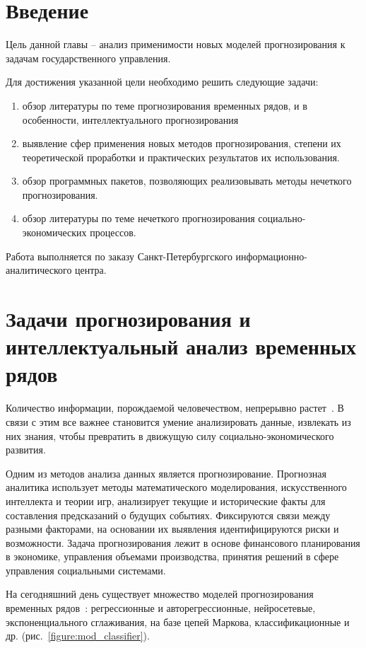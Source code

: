 \section*{Введение}

Цель данной главы – анализ применимости новых моделей прогнозирования к задачам государственного управления.

Для достижения указанной цели необходимо решить следующие задачи:
\begin{enumerate}
    \item обзор литературы по теме прогнозирования временных рядов, и в особенности, интеллектуального прогнозирования
    \item выявление сфер применения новых методов прогнозирования, степени их теоретической проработки и практических результатов их использования.    
    \item обзор программных пакетов, позволяющих реализовывать методы нечеткого прогнозирования.
	\item обзор литературы по теме нечеткого прогнозирования социально-экономических процессов.
\end{enumerate}
Работа выполняется по заказу Санкт-Петербургского информационно-аналитического центра.

\section{Задачи прогнозирования и интеллектуальный анализ временных рядов}

Количество информации, порождаемой человечеством, непрерывно
растет~\cite{Gantz2011}.  В связи с этим все важнее становится умение
анализировать данные, извлекать из них знания, чтобы превратить в движущую силу
социально-экономического развития. 

Одним из методов анализа данных является прогнозирование.  Прогнозная аналитика
использует методы математического моделирования, искусственного интеллекта и
теории игр, анализирует текущие и исторические факты для составления
предсказаний о будущих событиях.  Фиксируются связи между разными факторами, на
основании их выявления идентифицируются риски и возможности.  Задача
прогнозирования лежит в основе финансового планирования в экономике, управления
объемами производства, принятия решений в сфере управления социальными
системами.

На сегодняшний день существует множество моделей прогнозирования временных
рядов~\cite{Chuchueva2012}: регрессионные и авторегрессионные, нейросетевые,
экспоненциального сглаживания, на базе цепей Маркова, классификационные и др.
(рис.~\ref{figure:mod_classifier}).

